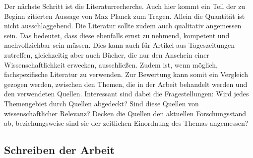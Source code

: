 Der nächste Schritt ist die Literaturrecherche. Auch hier kommt ein Teil der zu Beginn zitierten Aussage von Max Planck zum Tragen. Allein die Quantität ist nicht ausschlaggebend. Die Literatur sollte zudem auch qualitativ angemessen sein. Das bedeutet, dass diese ebenfalls ernst zu nehmend, kompetent und nachvollziehbar sein müssen. Dies kann auch für Artikel aus Tageszeitungen zutreffen, gleichzeitig aber auch Bücher, die nur den Anschein einer Wissenschaftlichkeit erwecken, ausschließen. Zudem ist, wenn möglich, fachspezifische Literatur zu verwenden.\cite[Vgl.][S. 7 f.]{Baensch:2013} Zur Bewertung kann somit ein Vergleich gezogen werden, zwischen den Themen, die in der Arbeit behandelt werden und den verwendeten Quellen. Interessant sind dabei die Fragestellungen: Wird jedes Themengebiet durch Quellen abgedeckt? Sind diese Quellen von wissenschaftlicher Relevanz? Decken die Quellen den aktuellen Forschungsstand ab, beziehungsweise sind sie der zeitlichen Einordnung des Themas angemessen?

\subsection{Schreiben der Arbeit}

